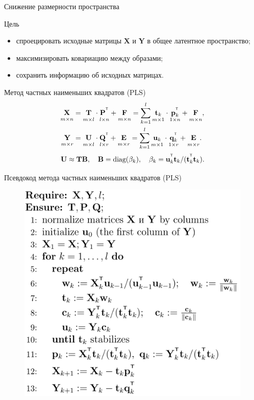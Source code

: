 \documentclass[9pt]{beamer}
\newcommand{\bp}{\mathbf{p}}
\newcommand{\bq}{\mathbf{q}}
\newcommand{\bt}{\mathbf{t}}
\newcommand{\bu}{\mathbf{u}}
\newcommand{\bB}{\mathbf{B}}
\newcommand{\bE}{\mathbf{E}}
\newcommand{\bF}{\mathbf{F}}
\newcommand{\bP}{\mathbf{P}}
\newcommand{\bQ}{\mathbf{Q}}
\newcommand{\bT}{\mathbf{T}}
\newcommand{\bU}{\mathbf{U}}
\newcommand{\bX}{\mathbf{X}}
\newcommand{\bY}{\mathbf{Y}}
\newcommand{\T}{^{\text{\tiny\sffamily\upshape\mdseries T}}}
\begin{document}
\begin{frame}{Снижение размерности пространства}
\begin{block}{Цель}
	\begin{itemize}
		\item спроецировать исходные матрицы $\bX$ и $\bY$ в общее латентное пространство;
		\item максимизировать ковариацию между образами;
		\item сохранить информацию об исходных матрицах.
	\end{itemize}
\end{block}
\begin{block}{Метод частных наименьших квадратов (PLS)}
	\vspace{-0.5cm}
\begin{align*}
\underset{m \times n}{\vphantom{\bQ}\bX} 
&= \underset{m \times l}{\vphantom{\bQ}\bT} \cdot \underset{l \times n}{\vphantom{\bQ}\bP^{\T}} + \underset{m \times n}{\vphantom{\bQ}\bF} 
= \sum_{k=1}^l \underset{m \times 1}{\vphantom{\bp_k^{\T}}\bt_k} \cdot \underset{1 \times n}{\bp_k^{\T}} + \underset{m \times n}{\vphantom{\bp_k^{\T}}\bF},\\
\underset{m \times r}{\vphantom{\bQ}\bY} 
&= \underset{m \times l}{\vphantom{\bQ}\bU} \cdot \underset{l \times r}{\bQ^{\T}} + \underset{m \times r}{\vphantom{\bQ}\bE}
=  \sum_{k=1}^l  \underset{m \times 1}{\vphantom{\bq_k^{\T}}\bu_k} \cdot \underset{1 \times r}{\bq_k^{\T}} +  \underset{m \times r}{\vphantom{\bq_k^{\T}}\bE}.
\end{align*}
\begin{equation*}
\bU \approx \bT \bB, \quad \bB = \text{diag}(\beta_k), \quad \beta_k = \bu_k^{\T}\bt_k / (\bt_k^{\T}\bt_k).
\end{equation*}
\end{block}

\end{frame}
\begin{frame}{Псевдокод метода частных наименьших квадратов (PLS)}

\begin{figure}
\begin{flushleft}
	\includegraphics[width=0.6\linewidth]{figs/pls_pseudocode}
\end{flushleft}
\end{figure}
\end{frame}
\end{document}
